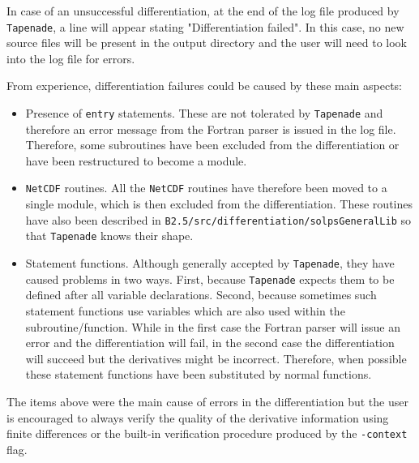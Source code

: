 In case of an unsuccessful differentiation, at the end of the log file produced by {\tt Tapenade}, a line will appear stating "Differentiation failed". In this case, no new source files will be present in the output directory and the user will need to look into the log file for errors.

From experience, differentiation failures could be caused by these main aspects:
\begin{itemize}
  \item Presence of {\tt entry} statements. These are not tolerated by {\tt Tapenade} and therefore an error message from the Fortran parser is issued in the log file. Therefore, some subroutines have been excluded from the differentiation or have been restructured to become a module.

  \item {\tt NetCDF} routines. All the {\tt NetCDF} routines have therefore been moved to a single module, which is then excluded from the differentiation. These routines have also been described in {\tt B2.5/src/differentiation/\allowbreak solpsGeneralLib} so that {\tt Tapenade} knows their shape.

  \item Statement functions. Although generally accepted by {\tt Tapenade}, they have caused problems in two ways. First, because {\tt Tapenade} expects them to be defined after all variable declarations. Second, because sometimes such statement functions use variables which are also used within the subroutine/function. While in the first case the Fortran parser will issue an error and the differentiation will fail, in the second case the differentiation will succeed but the derivatives might be incorrect. Therefore, when possible these statement functions have been substituted by normal functions.
\end{itemize}

The items above were the main cause of errors in the differentiation but the user is encouraged to always verify the quality of the derivative information using finite differences or the built-in verification procedure produced by the {\tt -context} flag.

